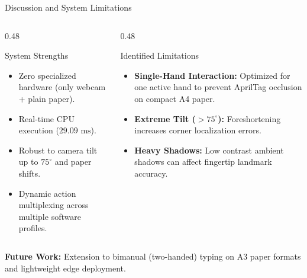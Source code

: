 \documentclass[aspectratio=169,10pt]{beamer}
\begin{document}
\begin{frame}{Discussion and System Limitations}
  \begin{columns}[T]
    \begin{column}{0.48\textwidth}
      \begin{block}{System Strengths}
        \small
        \begin{itemize}
          \item Zero specialized hardware (only webcam + plain paper).
          \item Real-time CPU execution ($29.09\text{ ms}$).
          \item Robust to camera tilt up to $75^\circ$ and paper shifts.
          \item Dynamic action multiplexing across multiple software profiles.
        \end{itemize}
      \end{block}
    \end{column}
    \begin{column}{0.48\textwidth}
      \begin{block}{Identified Limitations}
        \small
        \begin{itemize}
          \item \textbf{Single-Hand Interaction:} Optimized for one active hand to prevent AprilTag occlusion on compact A4 paper.
          \item \textbf{Extreme Tilt ($>75^\circ$):} Foreshortening increases corner localization errors.
          \item \textbf{Heavy Shadows:} Low contrast ambient shadows can affect fingertip landmark accuracy.
        \end{itemize}
      \end{block}
    \end{column}
  \end{columns}
  \vspace{0.6em}
  \small \textbf{Future Work:} Extension to bimanual (two-handed) typing on A3 paper formats and lightweight edge deployment.
\end{frame}
\end{document}
